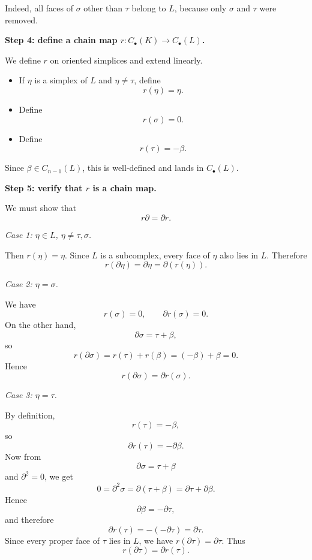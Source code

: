 \documentclass[12pt,a4paper]{article}
\theoremstyle{notespace}
\begin{document}
Indeed, all faces of \(\sigma\) other than \(\tau\) belong to \(L\), because only \(\sigma\) and \(\tau\) were removed.

\medskip

\textbf{Step 4: define a chain map \(r:C_\bullet(K)\to C_\bullet(L)\).}

We define \(r\) on oriented simplices and extend linearly.

\begin{itemize}
	\item If \(\eta\) is a simplex of \(L\) and \(\eta\neq \tau\), define
	\[
	r(\eta)=\eta.
	\]
	
	\item Define
	\[
	r(\sigma)=0.
	\]
	
	\item Define
	\[
	r(\tau)=-\beta.
	\]
\end{itemize}

Since \(\beta\in C_{n-1}(L)\), this is well-defined and lands in \(C_\bullet(L)\).

\medskip

\textbf{Step 5: verify that \(r\) is a chain map.}

We must show that
\[
r\partial = \partial r.
\]

\medskip

\emph{Case 1: \(\eta\in L\), \(\eta\neq \tau,\sigma\).}

Then \(r(\eta)=\eta\). Since \(L\) is a subcomplex, every face of \(\eta\) also lies in \(L\). Therefore
\[
r(\partial \eta)=\partial \eta=\partial(r(\eta)).
\]

\medskip

\emph{Case 2: \(\eta=\sigma\).}

We have
\[
r(\sigma)=0,
\qquad
\partial r(\sigma)=0.
\]
On the other hand,
\[
\partial \sigma = \tau+\beta,
\]
so
\[
r(\partial \sigma)=r(\tau)+r(\beta)=(-\beta)+\beta=0.
\]
Hence
\[
r(\partial \sigma)=\partial r(\sigma).
\]

\medskip

\emph{Case 3: \(\eta=\tau\).}

By definition,
\[
r(\tau)=-\beta,
\]
so
\[
\partial r(\tau)= -\partial \beta.
\]
Now from
\[
\partial \sigma = \tau+\beta
\]
and \(\partial^2=0\), we get
\[
0=\partial^2 \sigma = \partial(\tau+\beta)=\partial \tau+\partial \beta.
\]
Hence
\[
\partial \beta = -\partial \tau,
\]
and therefore
\[
\partial r(\tau)= -(-\partial \tau)=\partial \tau.
\]
Since every proper face of \(\tau\) lies in \(L\), we have \(r(\partial \tau)=\partial \tau\). Thus
\[
r(\partial \tau)=\partial r(\tau).
\]
\end{document}
